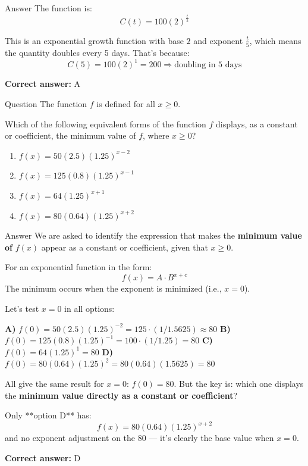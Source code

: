 \documentclass{beamer}
\begin{document}
\begin{frame}{Answer}
The function is:
\[
C(t) = 100(2)^{\frac{t}{5}}
\]

This is an exponential growth function with base $2$ and exponent $\frac{t}{5}$, which means the quantity doubles every 5 days. That’s because:
\[
C(5) = 100(2)^{1} = 200
\Rightarrow \text{doubling in 5 days}
\]

\textbf{Correct answer:} A
\end{frame}


\begin{frame}{Question}
The function $f$ is defined for all $x \geq 0$. 

Which of the following equivalent forms of the function $f$ displays, as a constant or coefficient, the minimum value of $f$, where $x \geq 0$?

\begin{enumerate}
  \item[A)] $f(x) = 50(2.5)(1.25)^{x - 2}$
  \item[B)] $f(x) = 125(0.8)(1.25)^{x - 1}$
  \item[C)] $f(x) = 64(1.25)^{x + 1}$
  \item[D)] $f(x) = 80(0.64)(1.25)^{x + 2}$
\end{enumerate}
\end{frame}



\begin{frame}{Answer}
\small
We are asked to identify the expression that makes the \textbf{minimum value of } $f(x)$ appear as a constant or coefficient, given that $x \geq 0$.

For an exponential function in the form:
\[
f(x) = A \cdot B^{x + c}
\]
The minimum occurs when the exponent is minimized (i.e., $x = 0$).

Let’s test $x = 0$ in all options:

\textbf{A)} $f(0) = 50(2.5)(1.25)^{-2} = 125 \cdot (1/1.5625) \approx 80$  
\textbf{B)} $f(0) = 125(0.8)(1.25)^{-1} = 100 \cdot (1/1.25) = 80$  
\textbf{C)} $f(0) = 64(1.25)^1 = 80$  
\textbf{D)} $f(0) = 80(0.64)(1.25)^2 = 80(0.64)(1.5625) = 80$

All give the same result for $x = 0$: $f(0) = 80$. But the key is: which one displays the \textbf{minimum value directly as a constant or coefficient}?

Only **option D** has:
\[
f(x) = \boxed{80}(0.64)(1.25)^{x + 2}
\]
and no exponent adjustment on the 80 — it’s clearly the base value when $x = 0$.

\textbf{Correct answer:} D
\end{frame}
\end{document}
